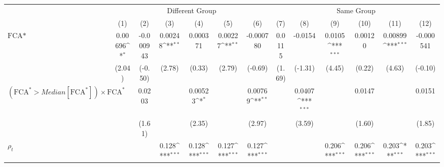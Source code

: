 {
\def\sym#1{\ifmmode^{#1}\else\(^{#1}\)\fi}
\begin{tabular}{l*{12}{c}}
\hline\hline
                    &\multicolumn{6}{c}{Different Group}                                                                                                &\multicolumn{6}{c}{Same Group}                                                                                                     \\\cmidrule(lr){2-7}\cmidrule(lr){8-13}
                    &\multicolumn{1}{c}{(1)}         &\multicolumn{1}{c}{(2)}         &\multicolumn{1}{c}{(3)}         &\multicolumn{1}{c}{(4)}         &\multicolumn{1}{c}{(5)}         &\multicolumn{1}{c}{(6)}         &\multicolumn{1}{c}{(7)}         &\multicolumn{1}{c}{(8)}         &\multicolumn{1}{c}{(9)}         &\multicolumn{1}{c}{(10)}         &\multicolumn{1}{c}{(11)}         &\multicolumn{1}{c}{(12)}         \\
\hline
$ \text{FCA*} $     &     0.00696\sym{*}  &   -0.000943         &     0.00248\sym{**} &    0.000371         &     0.00227\sym{**} &   -0.000780         &      0.0115         &     -0.0154         &      0.0105\sym{***}&     0.00120         &     0.00899\sym{***}&   -0.000541         \\
                    &      (2.04)         &     (-0.50)         &      (2.78)         &      (0.33)         &      (2.79)         &     (-0.69)         &      (1.69)         &     (-1.31)         &      (4.45)         &      (0.22)         &      (4.63)         &     (-0.10)         \\
[1em]
 $ (\text{FCA}^* > Median[\text{FCA}^*]) \times {\text{FCA} ^*}  $ &                     &      0.0203         &                     &     0.00523\sym{*}  &                     &     0.00769\sym{**} &                     &      0.0407\sym{***}&                     &      0.0147         &                     &      0.0151         \\
                    &                     &      (1.61)         &                     &      (2.35)         &                     &      (2.97)         &                     &      (3.59)         &                     &      (1.60)         &                     &      (1.85)         \\
[1em]
 $ {\rho_t} $       &                     &                     &       0.128\sym{***}&       0.128\sym{***}&       0.127\sym{***}&       0.127\sym{***}&                     &                     &       0.206\sym{***}&       0.206\sym{***}&       0.203\sym{***}&       0.203\sym{***}\\

\end{tabular}}
